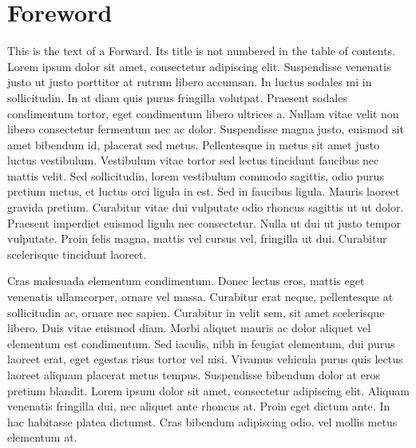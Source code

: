 \documentclass[12pt]{memoir}
\begin{document}
\chapter*{Foreword}
This is the text of a Forward. Its title is not numbered in the table of contents. Lorem ipsum dolor sit amet, consectetur adipiscing elit. Suspendisse venenatis justo ut justo porttitor at rutrum libero accumsan. In luctus sodales mi in sollicitudin. In at diam quis purus fringilla volutpat. Praesent sodales condimentum tortor, eget condimentum libero ultrices a. Nullam vitae velit non libero consectetur fermentum nec ac dolor. Suspendisse magna justo, euismod sit amet bibendum id, placerat sed metus. Pellentesque in metus sit amet justo luctus vestibulum. Vestibulum vitae tortor sed lectus tincidunt faucibus nec mattis velit. Sed sollicitudin, lorem vestibulum commodo sagittis, odio purus pretium metus, et luctus orci ligula in est. Sed in faucibus ligula. Mauris laoreet gravida pretium. Curabitur vitae dui vulputate odio rhoncus sagittis ut ut dolor. Praesent imperdiet euismod ligula nec consectetur. Nulla ut dui ut justo tempor vulputate. Proin felis magna, mattis vel cursus vel, fringilla ut dui. Curabitur scelerisque tincidunt laoreet.

Cras malesuada elementum condimentum. Donec lectus eros, mattis eget venenatis ullamcorper, ornare vel massa. Curabitur erat neque, pellentesque at sollicitudin ac, ornare nec sapien. Curabitur in velit sem, sit amet scelerisque libero. Duis vitae euismod diam. Morbi aliquet mauris ac dolor aliquet vel elementum est condimentum. Sed iaculis, nibh in feugiat elementum, dui purus laoreet erat, eget egestas risus tortor vel nisi. Vivamus vehicula purus quis lectus laoreet aliquam placerat metus tempus. Suspendisse bibendum dolor at eros pretium blandit. Lorem ipsum dolor sit amet, consectetur adipiscing elit. Aliquam venenatis fringilla dui, nec aliquet ante rhoncus at. Proin eget dictum ante. In hac habitasse platea dictumst. Cras bibendum adipiscing odio, vel mollis metus elementum at.
\end{document}
